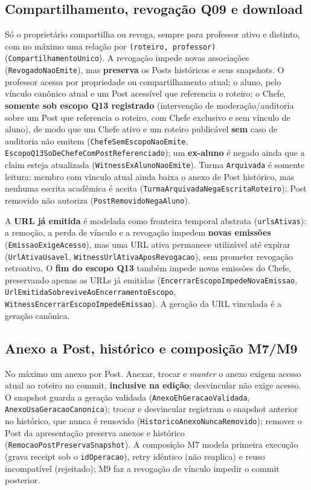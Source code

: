 \subsection*{Compartilhamento, revogação Q09 e download}
Só o proprietário compartilha ou revoga, sempre para professor ativo e distinto,
com no máximo uma relação por \texttt{(roteiro, professor)}
(\texttt{CompartilhamentoUnico}). A revogação impede novas associações
(\texttt{RevogadoNaoEmite}), mas \textbf{preserva} os Posts históricos e seus
snapshots. O professor acessa por propriedade ou compartilhamento atual; o aluno,
pelo vínculo canônico atual e um Post acessível que referencia o roteiro; o
Chefe, \textbf{somente sob escopo Q13 registrado} (intervenção de
moderação/auditoria sobre um Post que referencia o roteiro, com Chefe exclusivo e
sem vínculo de aluno), de modo que um Chefe ativo e um roteiro publicável
\textbf{sem} caso de auditoria não emitem
(\texttt{ChefeSemEscopoNaoEmite}, \texttt{EscopoQ13SoDeChefeComPostReferenciado});
um \textbf{ex-aluno} é negado ainda que a claim esteja atualizada
(\texttt{WitnessExAlunoNaoEmite}). Turma \texttt{Arquivada} é somente leitura:
membro com vínculo atual ainda baixa o anexo de Post histórico, mas nenhuma
escrita acadêmica é aceita (\texttt{TurmaArquivadaNegaEscritaRoteiro});
Post removido não autoriza (\texttt{PostRemovidoNegaAluno}).

A \textbf{URL já emitida} é modelada como fronteira temporal abstrata
(\texttt{urlsAtivas}): a remoção, a perda de vínculo e a revogação impedem
\textbf{novas emissões} (\texttt{EmissaoExigeAcesso}), mas uma URL ativa
permanece utilizável até expirar (\texttt{UrlAtivaUsavel},
\texttt{WitnessUrlAtivaAposRevogacao}), sem prometer revogação retroativa. O
\textbf{fim do escopo Q13} também impede novas emissões do Chefe, preservando
apenas as URLs já emitidas (\texttt{EncerrarEscopoImpedeNovaEmissao},
\texttt{UrlEmitidaSobreviveAoEncerramentoEscopo},
\texttt{WitnessEncerrarEscopoImpedeEmissao}). A geração da URL vinculada é a
geração canônica.

\subsection*{Anexo a Post, histórico e composição M7/M9}
No máximo um anexo por Post. Anexar, trocar e \emph{manter} o anexo exigem
acesso atual ao roteiro no commit, \textbf{inclusive na edição}; desvincular não
exige acesso. O snapshot guarda a geração validada
(\texttt{AnexoEhGeracaoValidada}, \texttt{AnexoUsaGeracaoCanonica}); trocar e
desvincular registram o snapshot anterior no histórico, que nunca é removido
(\texttt{HistoricoAnexoNuncaRemovido}); remover o Post da apresentação preserva
anexos e histórico (\texttt{RemocaoPostPreservaSnapshot}). A composição M7
modela primeira execução (grava receipt sob o \texttt{idOperacao}), retry
idêntico (não reaplica) e reuso incompatível (rejeitado); M9 faz a revogação de
vínculo impedir o commit posterior.

